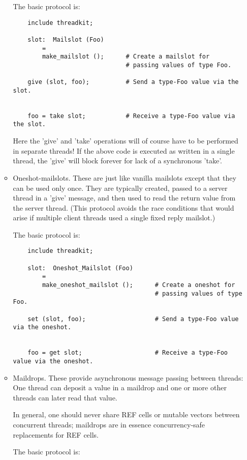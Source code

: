 \begin{itemize}
\begin{itemize}
The basic protocol is: 

\begin{verbatim}
    include threadkit;

    slot:  Mailslot (Foo)
        =
        make_mailslot ();      # Create a mailslot for
                               # passing values of type Foo.

    give (slot, foo);          # Send a type-Foo value via the slot.


    foo = take slot;           # Receive a type-Foo value via the slot.
\end{verbatim}


Here the 'give' and 'take' operations will of course 
have to be performed in separate threads!  If the above 
code is executed as written in a single thread, the 'give' 
will block forever for lack of a synchronous 'take'. 


\item 
Oneshot-mailslots.  These are just like vanilla mailslots 
except that they can be used only once.  They are typically 
created, passed to a server thread in a 'give' message, and 
then used to read the return value from the server thread. 
(This protocol avoids the race conditions that would arise 
if multiple client threads used a single fixed reply mailslot.) 

The basic protocol is: 

\begin{verbatim}
    include threadkit;

    slot:  Oneshot_Mailslot (Foo)
        =
        make_oneshot_mailslot ();      # Create a oneshot for
                                       # passing values of type Foo.

    set (slot, foo);                   # Send a type-Foo value via the oneshot.


    foo = get slot;                    # Receive a type-Foo value via the oneshot.
\end{verbatim}

\item 
Maildrops.  These provide asynchronous message passing 
between threads:  One thread can deposit a value in a 
maildrop and one or more other threads can later read 
that value.

In general, one should never share REF cells or mutable 
vectors between concurrent threads;  maildrops are in 
essence concurrency-safe replacements for REF cells. 

The basic protocol is: 


\end{itemize}
\end{itemize}

